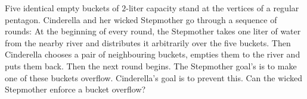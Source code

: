 Five identical empty buckets of $2$-liter capacity stand at the vertices of a regular pentagon. Cinderella and her wicked Stepmother go through a sequence of rounds: At the beginning of every round, the Stepmother takes one liter of water from the nearby river and distributes it arbitrarily over the five buckets. Then Cinderella chooses a pair of neighbouring buckets, empties them to the river and puts them back. Then the next round begins. The Stepmother goal's is to make one of these buckets overflow. Cinderella's goal is to prevent this. Can the wicked Stepmother enforce a bucket overflow?